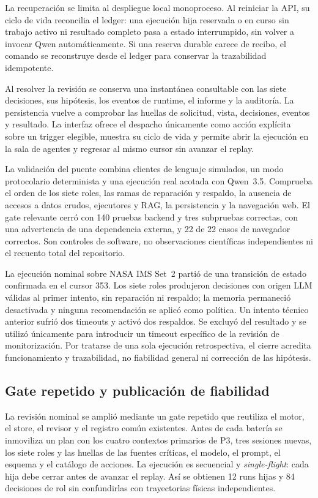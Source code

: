 La recuperación se limita al despliegue local monoproceso. Al reiniciar la API,
su ciclo de vida reconcilia el ledger: una ejecución hija reservada o en curso
sin trabajo activo ni resultado completo pasa a estado interrumpido, sin volver
a invocar Qwen automáticamente. Si una reserva durable carece de recibo, el
comando se reconstruye desde el ledger para conservar la trazabilidad
idempotente.

Al resolver la revisión se conserva una instantánea consultable con las siete
decisiones, sus hipótesis, los eventos de runtime, el informe y la auditoría.
La persistencia vuelve a comprobar las huellas de solicitud, vista, decisiones,
eventos y resultado. La interfaz ofrece el despacho únicamente como acción
explícita sobre un trigger elegible, muestra su ciclo de vida y permite abrir la
ejecución en la sala de agentes y regresar al mismo cursor sin avanzar el
replay.

La validación del puente combina clientes de lenguaje simulados, un modo
protocolario determinista y una ejecución real acotada con Qwen~3.5. Comprueba
el orden de los siete roles, las ramas de reparación y respaldo, la ausencia de
accesos a datos crudos, ejecutores y RAG, la persistencia y la navegación web.
El gate relevante cerró con 140 pruebas backend y tres subpruebas correctas,
con una advertencia de una dependencia externa, y 22 de 22 casos de navegador
correctos. Son controles de software, no observaciones científicas
independientes ni el recuento total del repositorio.

La ejecución nominal sobre NASA IMS Set~2 partió de una transición de estado
confirmada en el cursor 353. Los siete roles produjeron decisiones con origen
LLM válidas al primer intento, sin reparación ni respaldo; la memoria permaneció
desactivada y ninguna recomendación se aplicó como política. Un intento técnico
anterior sufrió dos timeouts y activó dos respaldos. Se excluyó del resultado y
se utilizó únicamente para introducir un timeout específico de la revisión de
monitorización. Por tratarse de una sola ejecución retrospectiva, el cierre
acredita funcionamiento y trazabilidad, no fiabilidad general ni corrección de
las hipótesis.

\subsection{Gate repetido y publicación de fiabilidad}

La revisión nominal se amplió mediante un gate repetido que reutiliza el motor,
el store, el revisor y el registro común existentes. Antes de cada batería se
inmoviliza un plan con los cuatro contextos primarios de P3, tres sesiones
nuevas, los siete roles y las huellas de las fuentes críticas, el modelo, el
prompt, el esquema y el catálogo de acciones. La ejecución es secuencial y
\emph{single-flight}: cada hija debe cerrar antes de avanzar el replay. Así se
obtienen 12 runs hijas y 84 decisiones de rol sin confundirlas con trayectorias
físicas independientes.

